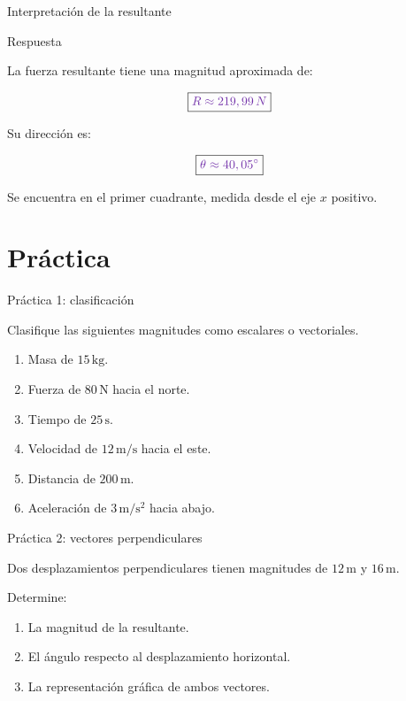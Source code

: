 \documentclass[aspectratio=169,11pt]{beamer}
\begin{document}
\begin{frame}{Interpretación de la resultante}

\begin{block}{Respuesta}

La fuerza resultante tiene
una magnitud aproximada de:

\[
\boxed{
\color{morado}{R\approx219,99\,N}
}
\]

Su dirección es:

\[
\boxed{
\color{morado}{\theta\approx40,05^\circ}
}
\]

Se encuentra en el primer cuadrante,
medida desde el eje \(x\) positivo.

\end{block}

\end{frame}

\section{Práctica}

\begin{frame}{Práctica 1: clasificación}

Clasifique las siguientes magnitudes
como escalares o vectoriales.

\begin{enumerate}
\item Masa de \(15\,\mathrm{kg}\).
\item Fuerza de \(80\,\mathrm{N}\)
hacia el norte.
\item Tiempo de \(25\,\mathrm{s}\).
\item Velocidad de \(12\,\mathrm{m/s}\)
hacia el este.
\item Distancia de \(200\,\mathrm{m}\).
\item Aceleración de
\(3\,\mathrm{m/s^2}\) hacia abajo.
\end{enumerate}

\end{frame}

\begin{frame}{Práctica 2: vectores perpendiculares}

Dos desplazamientos perpendiculares
tienen magnitudes de
\(12\,\mathrm{m}\) y \(16\,\mathrm{m}\).

Determine:

\begin{enumerate}
\item La magnitud de la resultante.
\item El ángulo respecto al
desplazamiento horizontal.
\item La representación gráfica
de ambos vectores.
\end{enumerate}

\end{frame}
\end{document}

